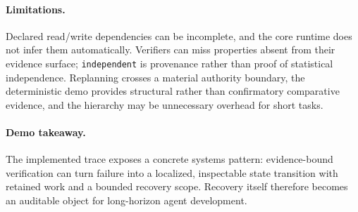 \documentclass{article}
\begin{document}
\paragraph{Limitations.}
Declared read/write dependencies can be incomplete, and the core runtime does not infer them automatically. Verifiers can miss properties absent from their evidence surface; \texttt{independent} is provenance rather than proof of statistical independence. Replanning crosses a material authority boundary, the deterministic demo provides structural rather than confirmatory comparative evidence, and the hierarchy may be unnecessary overhead for short tasks.

\paragraph{Demo takeaway.}
The implemented trace exposes a concrete systems pattern: evidence-bound verification can turn failure into a localized, inspectable state transition with retained work and a bounded recovery scope. Recovery itself therefore becomes an auditable object for long-horizon agent development.



\end{document}

